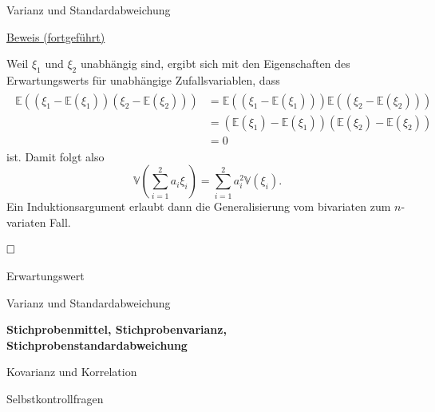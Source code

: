 \documentclass[
  8pt,
  ignorenonframetext,
]{beamer}
\begin{document}
\begin{frame}{Varianz und Standardabweichung}
\protect\hypertarget{varianz-und-standardabweichung-10}{}
\footnotesize

\underline{Beweis (fortgeführt)} \vspace{2mm}

Weil \(\xi_1\) und \(\xi_2\) unabhängig sind, ergibt sich mit den
Eigenschaften des Erwartungswerts für unabhängige Zufallsvariablen, dass
\begin{align}
\begin{split}
\mathbb{E}\left((\xi_1 - \mathbb{E}(\xi_1))(\xi_2 - \mathbb{E}(\xi_2))\right)
& = \mathbb{E}\left((\xi_1 - \mathbb{E}(\xi_1))\right)
    \mathbb{E}\left((\xi_2 - \mathbb{E}(\xi_2))\right) \\
& = (\mathbb{E}(\xi_1) - \mathbb{E}(\xi_1))
    (\mathbb{E}(\xi_2) - \mathbb{E}(\xi_2)) \\
& = 0
\end{split}
\end{align} ist. Damit folgt also \begin{equation}
\mathbb{V}\left(\sum_{i=1}^2 a_i \xi_i\right)
=  \sum_{i=1}^2 a_i^2\mathbb{V}(\xi_i).
\end{equation} Ein Induktionsargument erlaubt dann die Generalisierung
vom bivariaten zum \(n\)-variaten Fall.

\(\hfill\Box\)
\end{frame}

\begin{frame}{}
\protect\hypertarget{section-8}{}
\large
\vfill

Erwartungswert

Varianz und Standardabweichung

\normalsize

\textbf{Stichprobenmittel, Stichprobenvarianz,
Stichprobenstandardabweichung}

\large

Kovarianz und Korrelation

Selbstkontrollfragen \vfill
\end{frame}
\end{document}
